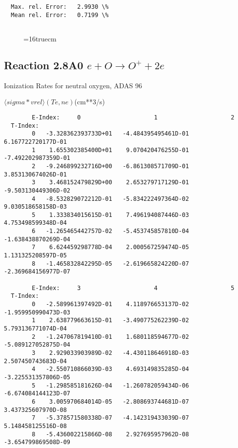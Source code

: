 \documentclass[12pt,dvipdfmx]{article}
\begin{document}
\begin{small}
\begin{verbatim}
  Max. rel. Error:   2.9930 \%
  Mean rel. Error:   0.7199 \%


\end{verbatim}\end{small}
\begin{figure} \label{2.7A0}
\epsfxsize=16truecm 
\end{figure}
\newpage


\subsection{
Reaction 2.8A0 $e + O \rightarrow O^+  + 2e $ }
  Ionization Rates for neutral  oxygen,   ADAS 96

$  \langle sigma*vrel \rangle(Te,ne) $(cm**3/s)
\begin{small}\begin{verbatim}
        E-Index:     0                     1                     2
  T-Index:
        0   -3.328362393733D+01   -4.484395495461D-01    6.167722720177D-01
        1    1.655302385400D+01    9.070420476255D-01   -7.492202987359D-01
        2   -9.246899232716D+00   -6.861308571709D-01    3.853130674026D-01
        3    3.468152479829D+00    2.653279717129D-01   -9.503130449306D-02
        4   -8.532829072212D-01   -5.834222497364D-02    9.030518658158D-03
        5    1.333834015615D-01    7.496194087446D-03    4.753498599348D-04
        6   -1.265465442757D-02   -5.453745857810D-04   -1.638438870269D-04
        7    6.624459298778D-04    2.000567259474D-05    1.131325208597D-05
        8   -1.465832842295D-05   -2.619665824220D-07   -2.369684156977D-07

        E-Index:     3                     4                     5
  T-Index:
        0   -2.589961397492D-01    4.118976653137D-02   -1.959950990473D-03
        1    2.638779663615D-01   -3.490775262239D-02    5.793136771074D-04
        2   -1.247067819410D-01    1.680118594677D-02   -5.089127052875D-04
        3    2.929033903989D-02   -4.430118646918D-03    2.507450743683D-04
        4   -2.550710866039D-03    4.693149835285D-04   -3.225531357806D-05
        5   -1.298585181626D-04   -1.260782059434D-06   -6.674084144123D-07
        6    3.005970684014D-05   -2.808693744681D-07    3.437325607970D-08
        7   -5.378571580338D-07   -4.142319433039D-07    5.148458125516D-08
        8   -5.436002215866D-08    2.927695957962D-08   -3.654799869508D-09


\end{verbatim}
\end{small}
\end{document}
